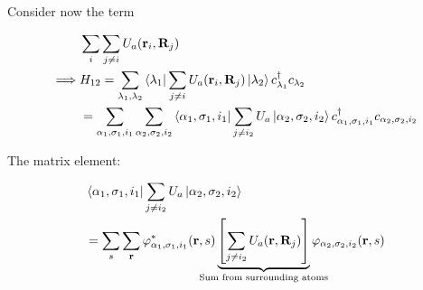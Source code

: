 \noindent Consider now the term

\begin{align*}
	& \sum_i \sum_{j \neq i} U_a ( \vb{r}_i, \vb{R}_j)\\
	\implies & H_{12} = \sum_{{\lambda_{1}}, {\lambda_{2}}} \bra{\lambda_{1}}  \sum_{j \neq i} U_a ( \vb{r}_i, \vb{R}_j) \ket{\lambda_{2}} c^{\dagger}_{ \lambda_1} c_{\lambda_{2}}\\
	&= \sum_{\alpha_1, \sigma_1, i_1} \sum_{\alpha_2, \sigma_2, i_2} \bra{\alpha_1, \sigma_1, i_1} \sum_{j \neq i_2} U_a \ket{\alpha_2, \sigma_2, i_2} c^{\dagger}_{\alpha_1, \sigma_1, i_1} c_{\alpha_2, \sigma_2, i_2}
\end{align*}

The matrix element: 

\begin{align*}
	&\bra{\alpha_1, \sigma_1, i_1} \sum_{j \neq i_2} U_a \ket{\alpha_2, \sigma_2, i_2}\\
	&= \sum_s \sum_{\vb{r}} \varphi_{\alpha_1, \sigma_1, i_1}^* (\vb{r},s) \underbrace{\left[\sum_{j\ne i_2} U_a (\vb{r},\vb{R}_j) \right] }_{\mathclap{\text{Sum from surrounding atoms}}}  \varphi_{\alpha_2, \sigma_2, i_2}(\vb{r},s)
\end{align*}

